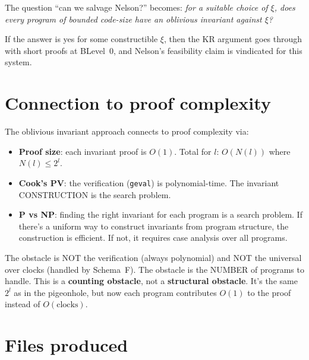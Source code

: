 \documentclass[11pt]{article}
\begin{document}
The question ``can we salvage Nelson?'' becomes: \emph{for a suitable choice of $\xi$, does every program of bounded code-size have an oblivious invariant against $\xi$?}

If the answer is yes for some constructible $\xi$, then the KR argument goes through with short proofs at BLevel~0, and Nelson's feasibility claim is vindicated for this system.

\section{Connection to proof complexity}

The oblivious invariant approach connects to proof complexity via:

\begin{itemize}
\item \textbf{Proof size}: each invariant proof is $O(1)$. Total for $l$: $O(N(l))$ where $N(l) \le 2^l$.
\item \textbf{Cook's PV}: the verification (\texttt{geval}) is polynomial-time. The invariant CONSTRUCTION is the search problem.
\item \textbf{P vs NP}: finding the right invariant for each program is a search problem. If there's a uniform way to construct invariants from program structure, the construction is efficient. If not, it requires case analysis over all programs.
\end{itemize}

The obstacle is NOT the verification (always polynomial) and NOT the universal over clocks (handled by Schema~F). The obstacle is the NUMBER of programs to handle. This is a \textbf{counting obstacle}, not a \textbf{structural obstacle}. It's the same
$2^l$ as in the pigeonhole, but now each program contributes $O(1)$ to the proof instead of $O(\text{clocks})$.

\section{Files produced}
\end{document}
